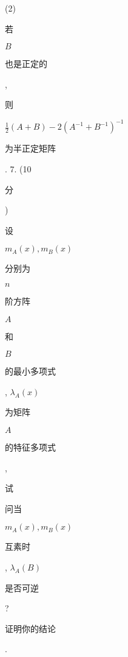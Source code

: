 \documentclass[10pt]{article}
\begin{document}
(2) \begin{CJK}{UTF8}{mj}若\end{CJK} $B$ \begin{CJK}{UTF8}{mj}也是正定的\end{CJK}, \begin{CJK}{UTF8}{mj}则\end{CJK} $\frac{1}{2}(A+B)-2\left(A^{-1}+B^{-1}\right)^{-1}$ \begin{CJK}{UTF8}{mj}为半正定矩阵\end{CJK}. 7. (10 \begin{CJK}{UTF8}{mj}分\end{CJK}) \begin{CJK}{UTF8}{mj}设\end{CJK} $m_{A}(x), m_{B}(x)$ \begin{CJK}{UTF8}{mj}分别为\end{CJK} $n$ \begin{CJK}{UTF8}{mj}阶方阵\end{CJK} $A$ \begin{CJK}{UTF8}{mj}和\end{CJK} $B$ \begin{CJK}{UTF8}{mj}的最小多项式\end{CJK}, $\lambda_{A}(x)$ \begin{CJK}{UTF8}{mj}为矩阵\end{CJK} $A$ \begin{CJK}{UTF8}{mj}的特征多项式\end{CJK}, \begin{CJK}{UTF8}{mj}试\end{CJK} \begin{CJK}{UTF8}{mj}问当\end{CJK} $m_{A}(x), m_{B}(x)$ \begin{CJK}{UTF8}{mj}互素时\end{CJK}, $\lambda_{A}(B)$ \begin{CJK}{UTF8}{mj}是否可逆\end{CJK}? \begin{CJK}{UTF8}{mj}证明你的结论\end{CJK}.
\end{document}
